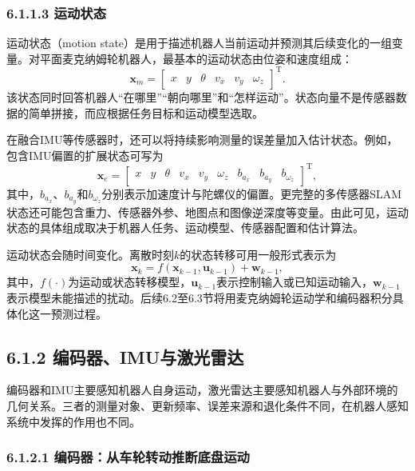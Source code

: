 \documentclass[UTF8,zihao=-4]{ctexart}
\newcommand{\vect}[1]{\bm{#1}}
\begin{document}
\subsubsection*{6.1.1.3 运动状态}

运动状态（motion state）是用于描述机器人当前运动并预测其后续变化的一组变量。对平面麦克纳姆轮机器人，最基本的运动状态由位姿和速度组成：
\begin{equation}
  \vect{x}_{m}=
  \begin{bmatrix}
    x & y & \theta & v_x & v_y & \omega_z
  \end{bmatrix}^{\mathrm T}.
  \label{eq:teaching-state}
\end{equation}
该状态同时回答机器人“在哪里”“朝向哪里”和“怎样运动”。状态向量不是传感器数据的简单拼接，而应根据任务目标和运动模型选取。

在融合IMU等传感器时，还可以将持续影响测量的误差量加入估计状态。例如，包含IMU偏置的扩展状态可写为
\begin{equation}
  \vect{x}_{e}=
  \begin{bmatrix}
    x & y & \theta & v_x & v_y & \omega_z & b_{a_x} & b_{a_y} & b_{\omega_z}
  \end{bmatrix}^{\mathrm T},
  \label{eq:extended-state}
\end{equation}
其中，$b_{a_x}$、$b_{a_y}$和$b_{\omega_z}$分别表示加速度计与陀螺仪的偏置。更完整的多传感器SLAM状态还可能包含重力、传感器外参、地图点和图像逆深度等变量\cite{fan2025fusion}。由此可见，运动状态的具体组成取决于机器人任务、运动模型、传感器配置和估计算法。

运动状态会随时间变化。离散时刻$k$的状态转移可用一般形式表示为
\begin{equation}
  \vect{x}_{k}=f(\vect{x}_{k-1},\vect{u}_{k-1})+\vect{w}_{k-1},
  \label{eq:state-transition}
\end{equation}
其中，$f(\cdot)$为运动或状态转移模型，$\vect{u}_{k-1}$表示控制输入或已知运动输入，$\vect{w}_{k-1}$表示模型未能描述的扰动。后续6.2至6.3节将用麦克纳姆轮运动学和编码器积分具体化这一预测过程。

\subsection*{6.1.2 编码器、IMU与激光雷达}

编码器和IMU主要感知机器人自身运动，激光雷达主要感知机器人与外部环境的几何关系。三者的测量对象、更新频率、误差来源和退化条件不同，在机器人感知系统中发挥的作用也不同。

\subsubsection*{6.1.2.1 编码器：从车轮转动推断底盘运动}
\end{document}

